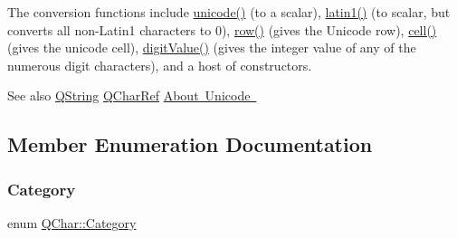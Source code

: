 The conversion functions include \mbox{\hyperlink{class_q_char_a0fd3d9a4b10d8f6482c5ebd8053b69a8}{unicode()}} (to a scalar), \mbox{\hyperlink{class_q_char_a1f86dd8a75eb74565a46caf76a41df8f}{latin1()}} (to scalar, but converts all non-\/\+Latin1 characters to 0), \mbox{\hyperlink{class_q_char_a8f987c65692f95eebc84bf687ea92aff}{row()}} (gives the Unicode row), \mbox{\hyperlink{class_q_char_a2475b4653bed4cf2a3f10395a14cc9c5}{cell()}} (gives the unicode cell), \mbox{\hyperlink{class_q_char_ac23377922296b84ca58ffaaee6d522af}{digit\+Value()}} (gives the integer value of any of the numerous digit characters), and a host of constructors.

\begin{DoxySeeAlso}{See also}
\mbox{\hyperlink{class_q_string}{Q\+String}} \mbox{\hyperlink{class_q_char_ref}{Q\+Char\+Ref}} \mbox{\hyperlink{class_q_char_a0fd3d9a4b10d8f6482c5ebd8053b69a8}{About Unicode }} 
\end{DoxySeeAlso}


\subsection{Member Enumeration Documentation}
\mbox{\label{class_q_char_a62908095db0c54f35ff2ae928c621a97}} 
\subsubsection{\texorpdfstring{Category}{Category}}
{\footnotesize\ttfamily enum \mbox{\hyperlink{class_q_char_a62908095db0c54f35ff2ae928c621a97}{Q\+Char\+::\+Category}}}

